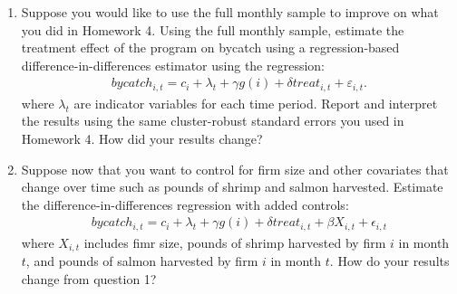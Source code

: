 \documentclass{article}
\begin{document}
\begin{enumerate}
    \item Suppose you would like to use the full monthly sample to improve on what you did in Homework 4.  Using the full monthly sample, estimate the treatment effect of the program on bycatch using a regression-based difference-in-differences estimator using the regression:
    \begin{align}
        bycatch_{i,t} = c_i + \lambda_t + \gamma g(i) + \delta treat_{i,t} + \varepsilon_{i,t}.
    \end{align}
    where \(\lambda_t\) are indicator variables for each time period.  Report and interpret the results using the same cluster-robust standard errors you used in Homework 4.  How did your results change?
    \item Suppose now that you want to control for firm size and other covariates that change over time such as pounds of shrimp and salmon harvested.  Estimate the difference-in-differences regression with added controls:
    \begin{align}
        bycatch_{i,t} = c_i + \lambda_t + \gamma g(i) + \delta treat_{i,t} + \beta X_{i,t} + \epsilon_{i,t}
    \end{align}
    where \(X_{i,t}\) includes fimr size, pounds of shrimp harvested by firm \(i\) in month \(t\), and pounds of salmon harvested by firm \(i\) in month \(t\).  How do your results change from question 1?
\end{enumerate}
\end{document}
